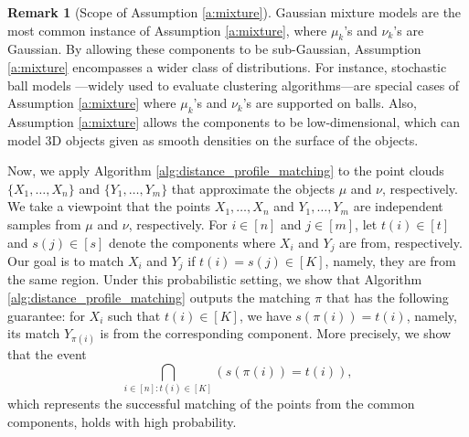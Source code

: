 \documentclass[11pt,letterpaper]{article}
\theoremstyle{definition}
\newtheorem{remark}{Remark}
\numberwithin{equation}{section}
\begin{document}
\begin{remark}[Scope of Assumption \ref{a:mixture}]
    \label{rmk:mixture}
    Gaussian mixture models are the most common instance of Assumption \ref{a:mixture}, where $\mu_k$'s and $\nu_k$'s are Gaussian. By allowing these components to be sub-Gaussian, Assumption \ref{a:mixture} encompasses a wider class of distributions. For instance, stochastic ball models \citep{nellore2015recovery,iguchi2017probably}---widely used to evaluate clustering algorithms---are special cases of Assumption \ref{a:mixture} where $\mu_k$'s and $\nu_k$'s are supported on balls. Also, Assumption \ref{a:mixture} allows the components to be low-dimensional, which can model 3D objects given as smooth densities on the surface of the objects.
\end{remark}

Now, we apply Algorithm \ref{alg:distance_profile_matching} to the point clouds $\{X_1, \ldots, X_n\}$ and $\{Y_1, \ldots, Y_m\}$ that approximate the objects $\mu$ and $\nu$, respectively. We take a viewpoint that the points $X_1, \ldots, X_n$ and $Y_1, \ldots, Y_m$ are independent samples from $\mu$ and $\nu$, respectively. For $i \in [n]$ and $j \in [m]$, let $t(i) \in [t]$ and $s(j) \in [s]$ denote the components where $X_i$ and $Y_j$ are from, respectively. Our goal is to match $X_i$ and $Y_j$ if $t(i) = s(j) \in [K]$, namely, they are from the same region. Under this probabilistic setting, we show that Algorithm \ref{alg:distance_profile_matching} outputs the matching $\pi$ that has the following guarantee: for $X_i$ such that $t(i) \in [K]$, we have $s(\pi(i)) = t(i)$, namely, its match $Y_{\pi(i)}$ is from the corresponding component. More precisely, we show that the event
\begin{equation}
    \label{eq:matching_success_event}
    \bigcap_{i \in [n] : t(i) \in [K]} (s(\pi(i)) = t(i)),
\end{equation}
which represents the successful matching of the points from the common components, holds with high probability. 
\end{document}
